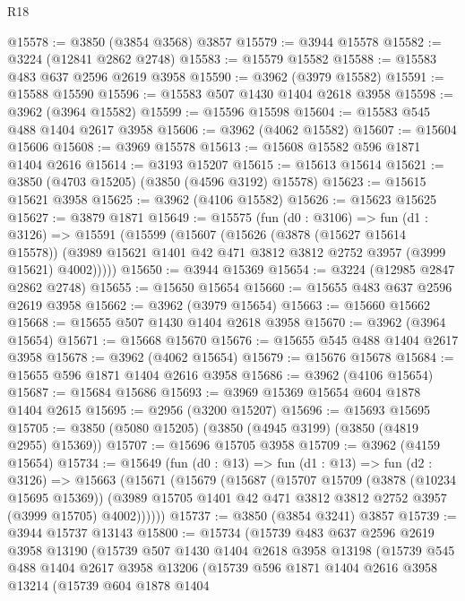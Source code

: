 \begin{lexlean}{R18}
\begin{coremodule}
@15578 := @3850 (@3854 @3568) @3857
@15579 := @3944 @15578
@15582 := @3224 (@12841 @2862 @2748)
@15583 := @15579 @15582
@15588 := @15583 @483 @637 @2596 @2619 @3958
@15590 := @3962 (@3979 @15582)
@15591 := @15588 @15590
@15596 := @15583 @507 @1430 @1404 @2618 @3958
@15598 := @3962 (@3964 @15582)
@15599 := @15596 @15598
@15604 := @15583 @545 @488 @1404 @2617 @3958
@15606 := @3962 (@4062 @15582)
@15607 := @15604 @15606
@15608 := @3969 @15578
@15613 := @15608 @15582 @596 @1871 @1404 @2616
@15614 := @3193 @15207
@15615 := @15613 @15614
@15621 := @3850 (@4703 @15205) (@3850 (@4596 @3192) @15578)
@15623 := @15615 @15621 @3958
@15625 := @3962 (@4106 @15582)
@15626 := @15623 @15625
@15627 := @3879 @1871
@15649 := @15575
    (fun (d0 : @3106) =>
    fun (d1 : @3126) =>
    @15591
      (@15599
        (@15607
          (@15626
            (@3878 (@15627 @15614 @15578))
            (@3989 @15621 @1401 @42 @471 @3812 @3812 @2752 @3957 (@3999 @15621) @4002)))))
@15650 := @3944 @15369
@15654 := @3224 (@12985 @2847 @2862 @2748)
@15655 := @15650 @15654
@15660 := @15655 @483 @637 @2596 @2619 @3958
@15662 := @3962 (@3979 @15654)
@15663 := @15660 @15662
@15668 := @15655 @507 @1430 @1404 @2618 @3958
@15670 := @3962 (@3964 @15654)
@15671 := @15668 @15670
@15676 := @15655 @545 @488 @1404 @2617 @3958
@15678 := @3962 (@4062 @15654)
@15679 := @15676 @15678
@15684 := @15655 @596 @1871 @1404 @2616 @3958
@15686 := @3962 (@4106 @15654)
@15687 := @15684 @15686
@15693 := @3969 @15369 @15654 @604 @1878 @1404 @2615
@15695 := @2956 (@3200 @15207)
@15696 := @15693 @15695
@15705 := @3850 (@5080 @15205) (@3850 (@4945 @3199) (@3850 (@4819 @2955) @15369))
@15707 := @15696 @15705 @3958
@15709 := @3962 (@4159 @15654)
@15734 := @15649
    (fun (d0 : @13) =>
    fun (d1 : @13) =>
    fun (d2 : @3126) =>
    @15663
      (@15671
        (@15679
          (@15687
            (@15707
              @15709
              (@3878 (@10234 @15695 @15369))
              (@3989 @15705 @1401 @42 @471 @3812 @3812 @2752 @3957 (@3999 @15705) @4002))))))
@15737 := @3850 (@3854 @3241) @3857
@15739 := @3944 @15737 @13143
@15800 := @15734
    (@15739
      @483
      @637
      @2596
      @2619
      @3958
      @13190
      (@15739
        @507
        @1430
        @1404
        @2618
        @3958
        @13198
        (@15739
          @545
          @488
          @1404
          @2617
          @3958
          @13206
          (@15739
            @596
            @1871
            @1404
            @2616
            @3958
            @13214
            (@15739
              @604
              @1878
              @1404

\end{coremodule}
\end{lexlean}
